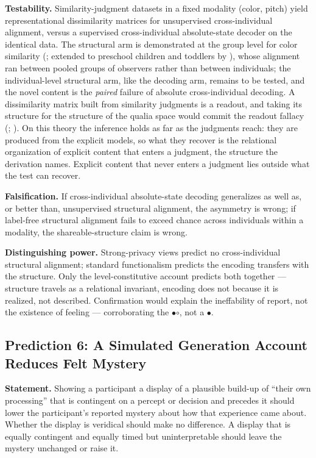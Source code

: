 \documentclass[12pt]{article}
\begin{document}
\textbf{Testability.} Similarity-judgment datasets in a fixed modality (color, pitch) yield representational dissimilarity matrices for unsupervised cross-individual alignment, versus a supervised cross-individual absolute-state decoder on the identical data. The structural arm is demonstrated at the group level for color similarity (\citealp{Kawakita2025}; extended to preschool children and toddlers by \citealp{Watanabe2026}), whose alignment ran between pooled groups of observers rather than between individuals; the individual-level structural arm, like the decoding arm, remains to be tested, and the novel content is the \emph{paired} failure of absolute cross-individual decoding. A dissimilarity matrix built from similarity judgments is a readout, and taking its structure for the structure of the qualia space would commit the readout fallacy (\citealp[p.~45]{Gruber2015}; \citealp[Section~2.7]{Gruber2026a}). On this theory the inference holds as far as the judgments reach: they are produced from the explicit models, so what they recover is the relational organization of explicit content that enters a judgment, the structure the derivation names. Explicit content that never enters a judgment lies outside what the test can recover.

\textbf{Falsification.} If cross-individual absolute-state decoding generalizes as well as, or better than, unsupervised structural alignment, the asymmetry is wrong; if label-free structural alignment fails to exceed chance across individuals within a modality, the shareable-structure claim is wrong.

\textbf{Distinguishing power.} Strong-privacy views predict no cross-individual structural alignment; standard functionalism predicts the encoding transfers with the structure. Only the level-constitutive account predicts both together --- structure travels as a relational invariant, encoding does not because it is realized, not described. Confirmation would explain the ineffability of report, not the existence of feeling --- corroborating the {\large$\bullet$\hspace{-8.5pt}$\circ$}, not a $\bullet$.

\subsection{Prediction 6: A Simulated Generation Account Reduces Felt Mystery}

\textbf{Statement.} Showing a participant a display of a plausible build-up of ``their own processing'' that is contingent on a percept or decision and precedes it should lower the participant's reported mystery about how that experience came about. Whether the display is veridical should make no difference. A display that is equally contingent and equally timed but uninterpretable should leave the mystery unchanged or raise it.
\end{document}
